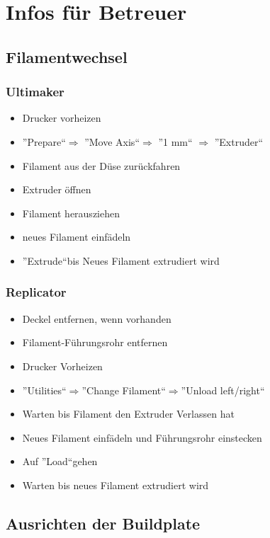 \documentclass{\basedir/fablab-document}
\newcommand{\ra}{$\Rightarrow$}
\begin{document}
\section{Infos für Betreuer}

\subsection{Filamentwechsel}\label{filamentwechsel}

\subsubsection{Ultimaker}

\begin{itemize}
\item Drucker vorheizen
\item ''Prepare``$\Rightarrow$ ''Move Axis``$\Rightarrow$ ''1 mm`` $\Rightarrow$ ''Extruder``
\item Filament aus der Düse zurückfahren
\item Extruder öffnen
\item Filament herausziehen
\item neues Filament einfädeln
\item ''Extrude``bis Neues Filament extrudiert wird
\end{itemize}

\subsubsection{Replicator}
\begin{itemize}
	\item Deckel entfernen, wenn vorhanden
	\item Filament-Führungsrohr entfernen
	\item Drucker Vorheizen
	\item ''Utilities``\ra ''Change Filament``\ra ''Unload left/right``
	\item Warten bis Filament den Extruder Verlassen hat 
	\item Neues Filament einfädeln und Führungsrohr einstecken
	\item Auf ''Load``gehen
	\item Warten bis neues Filament extrudiert wird
\end{itemize}

\subsection{Ausrichten der Buildplate}
\end{document}
